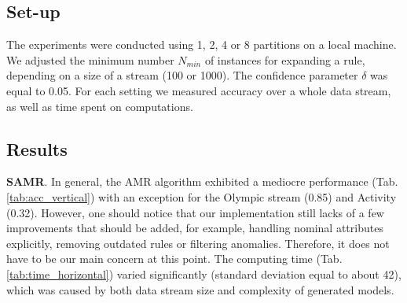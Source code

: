 \documentclass[journal]{IEEEtran}
\begin{document}
\subsection{Set-up}

The experiments were conducted using 1, 2, 4 or 8 partitions on a local machine. We adjusted the minimum number $N_{min}$ of instances for expanding a rule, depending on a size of a stream (100 or 1000). The confidence parameter $\delta$ was equal to 0.05. For each setting we measured accuracy over a whole data stream, as well as time spent on computations.

\subsection{Results}

\noindent\textbf{SAMR}. In general, the AMR algorithm exhibited a mediocre performance (Tab. \ref{tab:acc_vertical}) with an exception for the Olympic stream (0.85) and Activity (0.32). However, one should notice that our implementation still lacks of a few improvements that should be added, for example, handling nominal attributes explicitly, removing outdated rules or filtering anomalies. Therefore, it does not have to be our main concern at this point. The computing time (Tab. \ref{tab:time_horizontal}) varied significantly (standard deviation equal to about 42), which was caused by both data stream size and complexity of generated models.
\end{document}
